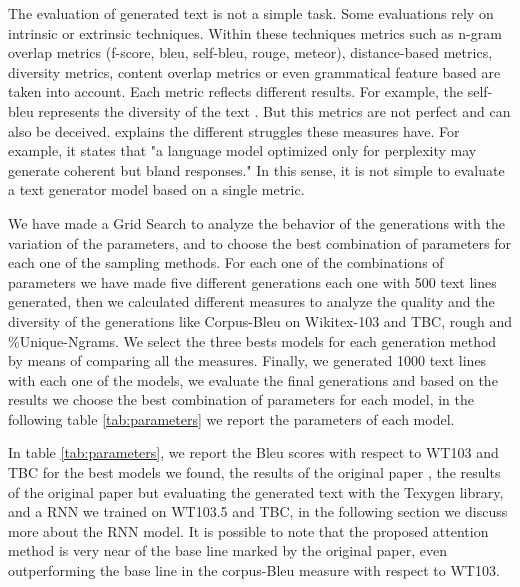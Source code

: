\documentclass[10pt,twocolumn,letterpaper]{article}
\begin{document}
The evaluation of generated text is not a simple task.
Some evaluations rely on intrinsic or extrinsic techniques.
Within these techniques metrics such as n-gram overlap metrics (f-score, bleu, self-bleu, rouge, meteor),
distance-based metrics, diversity metrics, content overlap metrics or even grammatical feature based
are taken into account.
Each metric reflects different results.
For example, the self-bleu represents the diversity of the text \cite{texygen}.
But this metrics are not perfect and can also be deceived.
\cite{evaltextgen1} explains the different struggles these measures have.
For example, it states that "a language model optimized only for perplexity
may generate coherent but bland responses."
In this sense, it is not simple to evaluate a text generator model based on a single metric.


We have made a Grid Search to analyze the behavior of the generations with the variation of the parameters,
and to choose the best combination of parameters for each one of the sampling methods. For each one of the
combinations of parameters we have made five different generations each one with 500 text lines generated,
then we calculated different measures to analyze the quality and the diversity of the generations like
Corpus-Bleu on Wikitex-103 and TBC, rough and \%Unique-Ngrams. We select the three bests models for each
generation method by means of comparing all the measures. Finally, we generated 1000 text lines with each one
of the models, we evaluate the final generations and based on the results we choose the best combination of
parameters for each model, in the following table \ref{tab:parameters} we report the parameters of each model.

In table \ref{tab:parameters}, we report the Bleu scores with respect to WT103 and TBC for the best models we found,
the results of the original paper \cite{wang2019bert}, the results of the original paper but evaluating the generated
text with the Texygen library, and a RNN we trained on WT103.5 and TBC, in the following section we discuss more about
the RNN model. It is possible to note that the proposed attention method is very near of the base line marked by the
original paper, even outperforming the base line in the corpus-Bleu measure with respect to WT103.
\end{document}
